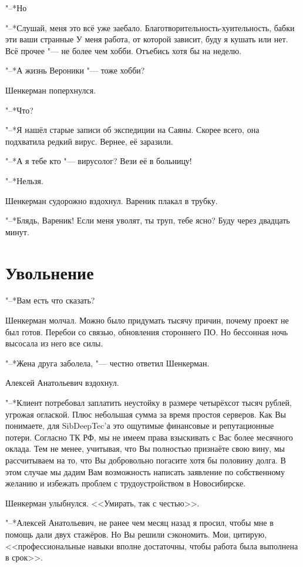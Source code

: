 "--*Но\ldotst

"--*Слушай, меня это всё уже заебало.
Благотворительность-хуительность, бабки эти ваши странные\ldotst
У меня работа, от которой зависит, буду я кушать или нет.
Всё прочее "--- не более чем хобби.
Отъебись хотя бы на неделю.

"--*А жизнь Вероники "--- тоже хобби?

Шенкерман поперхнулся.

"--*Что?

"--*Я нашёл старые записи об экспедиции на Саяны.
Скорее всего, она подхватила редкий вирус.
Вернее, её заразили.

"--*А я тебе кто "--- вирусолог?
Вези её в больницу!

"--*Нельзя.

Шенкерман судорожно вздохнул.
Вареник плакал в трубку.

"--*Блядь, Вареник!
Если меня уволят, ты труп, тебе ясно?
Буду через двадцать минут.

\section{Увольнение}

"--*Вам есть что сказать?

Шенкерман молчал.
Можно было придумать тысячу причин, почему проект не был готов.
Перебои со связью, обновления стороннего ПО.
Но бессонная ночь высосала из него все силы.

"--*Жена друга заболела, "--- честно ответил Шенкерман.

Алексей Анатольевич вздохнул.

"--*Клиент потребовал заплатить неустойку в размере четырёхсот тысяч рублей, угрожая оглаской.
Плюс небольшая сумма за время простоя серверов.
Как Вы понимаете, для SibDeepTec'а это ощутимые финансовые и репутационные потери.
Согласно ТК РФ, мы не имеем права взыскивать с Вас более месячного оклада.
Тем не менее, учитывая, что Вы полностью признаёте свою вину, мы рассчитываем на то, что Вы добровольно погасите хотя бы половину долга.
В этом случае мы дадим Вам возможность написать заявление по собственному желанию и избежать проблем с трудоустройством в Новосибирске.

Шенкерман улыбнулся.
<<Умирать, так с честью>>.

"--*Алексей Анатольевич, не ранее чем месяц назад я просил, чтобы мне в помощь дали двух стажёров.
Но Вы решили сэкономить.
Мои, цитирую, <<профессиональные навыки вполне достаточны, чтобы работа была выполнена в срок>>.

